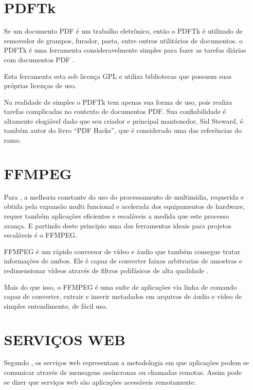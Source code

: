\section{PDFTk}

Se um documento PDF é um trabalho eletrônico, então o PDFTk é utilizado de removedor de grampos, furador, pasta, entre outros utilitários de documentos. o PDFTk é uma ferramenta consideravelmente simples para fazer as tarefas diárias com documentos PDF \cite{STEWARD}.

Esta ferramenta esta sob licença GPL e utiliza bibliotecas que possuem suas próprias licenças de uso.

Na realidade de simples o PDFTk tem apenas sua forma de uso, pois realiza tarefas complicadas no contexto de documentos PDF. Sua confiabilidade é altamente elogiável dado que seu criador e principal mantenedor, Sid Steward, é também autor do livro “PDF Hacks”, que é considerado uma das referências do ramo.


\section{FFMPEG}

Para , a melhoria constante do uso do processamento de multimídia, requerida e obtida pela expansão multi funcional e acelerada dos equipamentos de hardware, requer também aplicações eficientes e escaláveis a medida que este processo avança. E partindo deste principio uma das ferramentas ideais para projetos escaláveis é o FFMPEG.

FFMPEG é um rápido conversor de vídeo e áudio que também consegue tratar informações de ambos. Ele é capaz de converter faixas arbitrarias de amostras e redimensionar vídeos através de filtros polifásicos de alta qualidade \cite{FFMPEG}.

Mais do que isso, o FFMPEG é uma suíte de aplicações via linha de comando capaz de converter, extrair e inserir metadados em arquivos de áudio e vídeo de simples entendimento, de fácil uso.


\section{SERVIÇOS WEB}

Segundo , os serviços web representam a metodologia em que aplicações podem se comunicar através de mensagens assíncronas ou chamadas remotas. Assim pode se dizer que serviços web são aplicações acessáveis remotamente.

